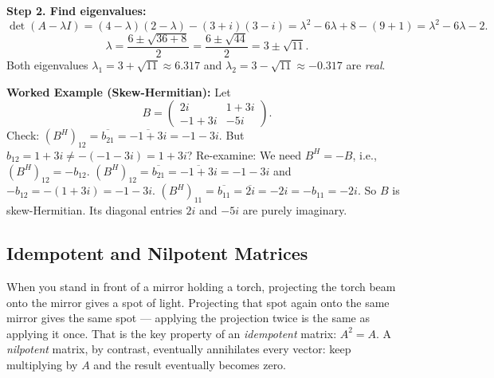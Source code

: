 \documentclass[12pt,a4paper]{article}
\begin{document}
\textbf{Step 2. Find eigenvalues:}
\[
  \det(A - \lambda I) = (4-\lambda)(2-\lambda) - (3+i)(3-i)
    = \lambda^2 - 6\lambda + 8 - (9 + 1)
    = \lambda^2 - 6\lambda - 2.
\]
\[
  \lambda = \frac{6 \pm \sqrt{36 + 8}}{2} = \frac{6 \pm \sqrt{44}}{2} = 3 \pm \sqrt{11}.
\]
Both eigenvalues $\lambda_1 = 3 + \sqrt{11} \approx 6.317$ and $\lambda_2 = 3 - \sqrt{11} \approx -0.317$ are \emph{real}. \quad \checkmark

\textbf{Worked Example (Skew-Hermitian):} Let
\[
  B = \begin{pmatrix} 2i & 1+3i \\ -1+3i & -5i \end{pmatrix}.
\]
Check: $(B^H)_{12} = \overline{b_{21}} = \overline{-1+3i} = -1-3i$.
But $b_{12} = 1+3i \neq -(-1-3i) = 1+3i$? Re-examine:
We need $B^H = -B$, i.e., $(B^H)_{12} = -b_{12}$.
$(B^H)_{12} = \overline{b_{21}} = \overline{-1+3i} = -1-3i$ and $-b_{12} = -(1+3i) = -1-3i$. \quad \checkmark
$(B^H)_{11} = \overline{b_{11}} = \overline{2i} = -2i = -b_{11} = -2i$. \quad \checkmark
So $B$ is skew-Hermitian. Its diagonal entries $2i$ and $-5i$ are purely imaginary. \quad \checkmark

\subsection{Idempotent and Nilpotent Matrices}

When you stand in front of a mirror holding a torch, projecting the torch beam onto the mirror gives a spot of light.
Projecting that spot again onto the same mirror gives the same spot --- applying the projection twice is the same as applying it once.
That is the key property of an \emph{idempotent} matrix: $A^2 = A$.
A \emph{nilpotent} matrix, by contrast, eventually annihilates every vector: keep multiplying by $A$ and the result eventually becomes zero.
\end{document}

